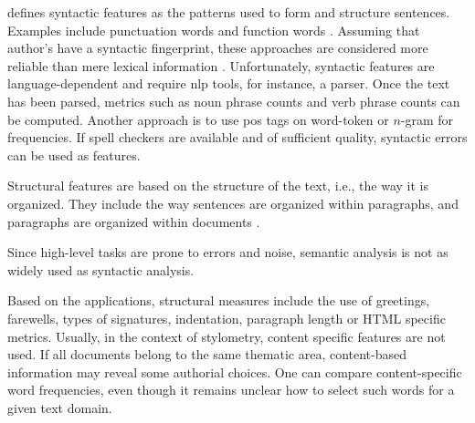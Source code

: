 \citet{elmanarelbouanani_authorship_2014} defines syntactic features as the patterns used to form and structure sentences.
Examples include punctuation words and function words \cite{elmanarelbouanani_authorship_2014}.
Assuming that author's have a syntactic fingerprint, these approaches are considered more reliable than mere lexical information \cite{bevendorff_overview_2024}.
Unfortunately, syntactic features are language-dependent and require \ac{nlp} tools, for instance, a parser.
Once the text has been parsed, metrics such as noun phrase counts and verb phrase counts can be computed.
Another approach is to use \ac{pos} tags on word-token or $n$-gram for frequencies.
If spell checkers are available and of sufficient quality, syntactic errors can be used as features.

Structural features are based on the structure of the text, i.e., the way it is organized.
They include the way sentences are organized within paragraphs, and paragraphs are organized within documents \cite{elmanarelbouanani_authorship_2014}.


Since high-level tasks are prone to errors and noise, semantic analysis is not as widely used as syntactic analysis.


Based on the applications, structural measures include the use of greetings, farewells, types of signatures, indentation, paragraph length 
or HTML specific metrics.
Usually, in the context of stylometry, content specific features are not used.
If all documents belong to the same thematic area, content-based information may reveal some authorial choices. 
One can compare content-specific word frequencies, even though it remains unclear how to select such words for a given text domain.

